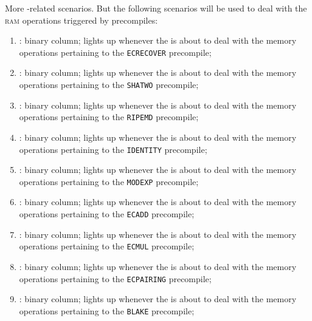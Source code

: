 More -related scenarios. But the following scenarios will be used to deal with the \textsc{ram} operations triggered by precompiles: 
\begin{enumerate}[resume]
	\item \scenEcrecover:
		binary column; lights up whenever the \zkEvm{} is about to deal with the memory operations pertaining to the \texttt{ECRECOVER} precompile;
	\item \scenShaTwo:
		binary column; lights up whenever the \zkEvm{} is about to deal with the memory operations pertaining to the \texttt{SHATWO} precompile;
	\item \scenRipemd:
		binary column; lights up whenever the \zkEvm{} is about to deal with the memory operations pertaining to the \texttt{RIPEMD} precompile;
	\item \scenIdentity:
		binary column; lights up whenever the \zkEvm{} is about to deal with the memory operations pertaining to the \texttt{IDENTITY} precompile;
	\item \scenModexp:
		binary column; lights up whenever the \zkEvm{} is about to deal with the memory operations pertaining to the \texttt{MODEXP} precompile;
	\item \scenEcadd:
		binary column; lights up whenever the \zkEvm{} is about to deal with the memory operations pertaining to the \texttt{ECADD} precompile;
	\item \scenEcmul:
		binary column; lights up whenever the \zkEvm{} is about to deal with the memory operations pertaining to the \texttt{ECMUL} precompile;
	\item \scenEcpairing:
		binary column; lights up whenever the \zkEvm{} is about to deal with the memory operations pertaining to the \texttt{ECPAIRING} precompile;
	\item \scenBlake:
		binary column; lights up whenever the \zkEvm{} is about to deal with the memory operations pertaining to the \texttt{BLAKE} precompile;
\end{enumerate}

